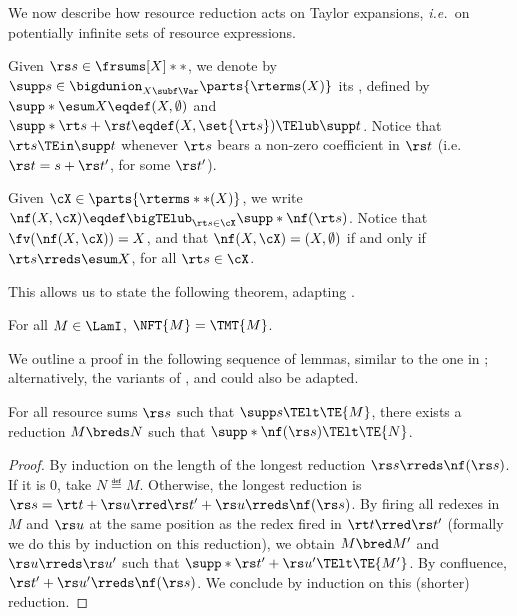 We now describe how resource reduction acts on Taylor expansions, \emph{i.e.\ }on potentially infinite sets of resource expressions.

\begin{notation} \label{not:support}\mbox{}
\bsub
\item Given $\rs s \in \frsums[X]**$,
	we denote by $\supp s \in \bigdunion_{X \subf \Var} \parts{\rterms(X)}$ 
	its , defined by
	$\supp*{\esum X} \eqdef (X,\emptyset)$ and
	$\supp*{\rt s + \rs t} \eqdef (X,\set{\rt s}) \TElub \supp t$.
	Notice that $\rt s \TEin \supp t$ whenever $\rt s$ 
	bears a non-zero coefficient in $\rs t$ (i.e.\ $\rs t = s + \rs t'$, for some $\rs t'$).
\item Given $\cX \in \parts{\rterms**(X)}$, we write 
	$\nf(X, \cX) \eqdef \bigTElub_{\rt s \in \cX} \supp*{ \nf(\rt s) }$.
	Notice that $\fv(\nf(X, \cX)) = X$, and that
	$\nf(X, \cX) = (X, \emptyset)$ if and only if
	$\rt s \rreds \esum X$, for all $\rt s \in \cX$.
\esub
\end{notation}

This allows us to state the following theorem,
adapting \cite[Theorem~2]{Ehrhard.Reg.06}.

\begin{theorem}[Commutation] \label{the:commutation}
	For all $M \in \LamI$, $\NFT{M} = \TMT{M}$.
\end{theorem}

We outline a proof in the following sequence of lemmas,
similar to the one in \cite{Barbarossa.Man.19};
alternatively, the variants of \cite{Ehrhard.Reg.06,Ehrhard.Reg.08},
\cite{OlimpieriVaux22} and \cite{Cerda.24,CerdaVaux23}
could also be adapted.

\setcounter{lem:rred-conserv-bred}{\thetheorem}
\begin{lemma}
\label{lem:rred-conserv-bred}
	For all resource sums $\rs s$ such that $\supp s \TElt \TE{M}$,
	there exists a reduction $M \breds N$
	such that $\supp*{\nf(\rs s)} \TElt \TE{N}$.
\end{lemma}

	\begin{proof}
	By induction on the length of the longest reduction 
	$\rs s \rreds \nf(\rs s)$.
	If it is $0$, take $N \eqdef M$.
	Otherwise, the longest reduction is
	$\rs s = \rt t + \rs u \rred \rs t' + \rs u \rreds \nf(\rs s)$.
	By firing all redexes in $M$ and $\rs u$ at the same position
	as the redex fired in $\rt t \rred \rs t'$
	(formally we do this by induction on this reduction),
	we obtain $M \bred M'$ and $\rs u \rreds \rs u'$ such that
	$\supp*{\rs t' + \rs u'} \TElt \TE{M'}$.
	By confluence, $\rs t' + \rs u' \rreds \nf(\rs s)$.
	We conclude by induction on this (shorter) reduction.
	\end{proof}

